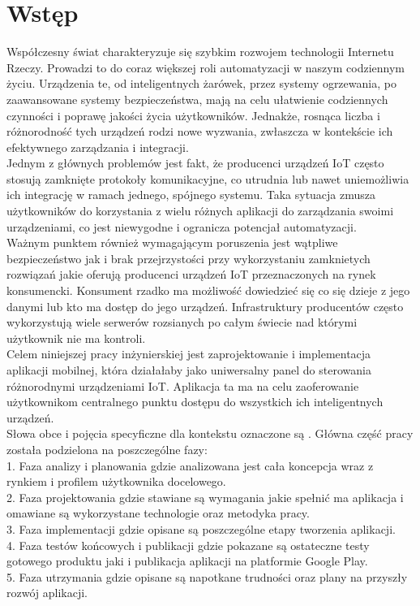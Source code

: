 \section{Wstęp}
Współczesny świat charakteryzuje się szybkim rozwojem technologii Internetu Rzeczy. Prowadzi to do coraz większej roli automatyzacji w naszym codziennym życiu. Urządzenia te, od inteligentnych żarówek, przez systemy ogrzewania, po zaawansowane systemy bezpieczeństwa, mają na celu ułatwienie codziennych czynności i poprawę jakości życia użytkowników. Jednakże, rosnąca liczba i różnorodność tych urządzeń rodzi nowe wyzwania, zwłaszcza w kontekście ich efektywnego zarządzania i integracji.\\

Jednym z głównych problemów jest fakt, że producenci urządzeń IoT często stosują zamknięte protokoły komunikacyjne, co utrudnia lub nawet uniemożliwia ich integrację w ramach jednego, spójnego systemu. Taka sytuacja zmusza użytkowników do korzystania z wielu różnych aplikacji do zarządzania swoimi urządzeniami, co jest niewygodne i ogranicza potencjał automatyzacji.\\

Ważnym punktem również wymagającym poruszenia jest wątpliwe bezpieczeństwo jak i brak przejrzystości przy wykorzystaniu zamknietych rozwiązań jakie oferują producenci urządzeń IoT przeznaczonych na rynek konsumencki. Konsument rzadko ma możliwość dowiedzieć się co się dzieje z jego danymi lub kto ma dostęp do jego urządzeń. Infrastruktury producentów często wykorzystują wiele serwerów rozsianych po całym świecie nad którymi użytkownik nie ma kontroli.\\

Celem niniejszej pracy inżynierskiej jest zaprojektowanie i implementacja aplikacji mobilnej, która działałaby jako uniwersalny panel do sterowania różnorodnymi urządzeniami IoT. Aplikacja ta ma na celu zaoferowanie użytkownikom centralnego punktu dostępu do wszystkich ich inteligentnych urządzeń.\\

Słowa obce i pojęcia specyficzne dla kontekstu oznaczone są .
Główna część pracy została podzielona na poszczególne fazy:\\

1. Faza analizy i planowania gdzie analizowana jest cała koncepcja wraz z rynkiem i profilem użytkownika docelowego.\\

2. Faza projektowania gdzie stawiane są wymagania jakie spełnić ma aplikacja i omawiane są wykorzystane technologie oraz metodyka pracy.\\

3. Faza implementacji gdzie opisane są poszczególne etapy tworzenia aplikacji.\\

4. Faza testów końcowych i publikacji gdzie pokazane są ostateczne testy gotowego produktu jaki i publikacja aplikacji na platformie Google Play.\\

5. Faza utrzymania gdzie opisane są napotkane trudności oraz plany na przyszły rozwój aplikacji.